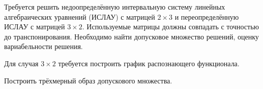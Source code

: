 Требуется решить недоопределённую интервальную систему линейных алгебраических уравнений (ИСЛАУ) с матрицей $2 \times 3$ и переопределённую ИСЛАУ с матрицей $3 \times 2$. Используемые матрицы должны совпадать с точностью до транспонирования. Необходимо найти допусковое множество решений, оценку вариабельности решения.

Для случая $3 \times 2$ требуется построить график распознающего функционала.

Построить трёхмерный образ допускового множества.